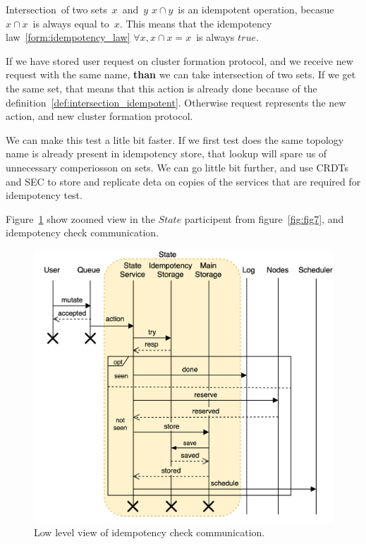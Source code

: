 \begin{definition}\label{def:intersection_idempotent}
	Intersection of two sets $x$ and $y$ $x \cap y$ is an idempotent operation, becasue $x \cap x$ is always equal to $x$. This means that the idempotency law~\ref{form:idempotency_law} $\forall x, x \cap x = x$ is always $true$.
\end{definition}

If we have stored user request on cluster formation protocol, and we receive new request with the same name, \textbf{than} we can take intersection of two sets. If we get the same set, that means that this action is already done because of the definition~\ref{def:intersection_idempotent}. Otherwise request represents the new action, and new cluster formation protocol. 

We can make this test a litle bit faster. If we first test does the same topology name is already present in idempotency store, that lookup will spare us of unnecessary comperiosson on sets.
We can go little bit further, and use CRDTs and SEC to store and replicate deta on copies of the services that are required for idempotency test.

Figure~\ref{fig:fig13} show zoomed view in the $State$ participent from figure~\ref{fig:fig7}, and idempotency check communication.

\begin{figure}[H]
	\begin{center}
		\includegraphics[scale=0.7]{images/Figure13}
	\end{center}
	\vspace{-0.7cm}
	\caption{Low level view of idempotency check communication.}
	\label{fig:fig13}
\end{figure}

